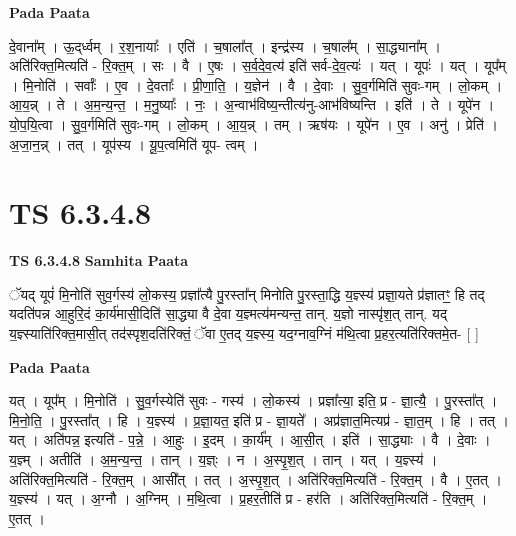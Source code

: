 \documentclass[17pt]{extarticle}
\begin{document}
\textbf{Pada Paata} \newline

दे॒वाना᳚म् । ऊ॒द्‌र्ध्वम् । र॒श॒नायाः᳚ । एति॑ । च॒षाला᳚त् । इन्द्र॑स्य । च॒षाल᳚म् । सा॒द्ध्याना᳚म् । अति॑रिक्त॒मित्यति॑ - रि॒क्त॒म् । सः । वै । ए॒षः । स॒र्व॒दे॒व॒त्य॑ इति॑ सर्व-दे॒व॒त्यः॑ । यत् । यूपः॑ । यत् । यूप᳚म् । मि॒नोति॑ । सर्वाः᳚ । ए॒व । दे॒वताः᳚ । प्री॒णा॒ति॒ । य॒ज्ञेन॑ । वै । दे॒वाः । सु॒व॒र्गमिति॑ सुवः-गम् । लो॒कम् । आ॒य॒न्न् । ते । अ॒म॒न्य॒न्त॒ । म॒नु॒ष्याः᳚ । नः॒ । अ॒न्वाभ॑विष्य॒न्तीत्य॑नु-आभ॑विष्यन्ति । इति॑ । ते । यूपे॑न । यो॒प॒यि॒त्वा । सु॒व॒र्गमिति॑ सुवः-गम् । लो॒कम् । आ॒य॒न्न् । तम् । ऋष॑यः । यूपे॑न । ए॒व । अनु॑ । प्रेति॑ । अ॒जा॒न॒न्न् । तत् । यूप॑स्य । यू॒प॒त्वमिति॑ यूप- त्वम् ।  \newline




\section*{ TS 6.3.4.8 }

\textbf{TS 6.3.4.8 } \newline
\textbf{Samhita Paata} \newline

ॅयद् यूपं॑ मि॒नोति॑ सुव॒र्गस्य॑ लो॒कस्य॒ प्रज्ञा᳚त्यै पु॒रस्ता᳚न् मिनोति पु॒रस्ता॒द्धि य॒ज्ञ्स्य॑ प्रज्ञा॒यते प्र॑ज्ञातꣳ॒॒ हि तद् यदति॑पन्न आ॒हुरि॒दं का॒र्य॑मासी॒दिति॑ सा॒द्ध्या वै दे॒वा य॒ज्ञ्मत्य॑मन्यन्त॒ तान्. य॒ज्ञो नास्पृ॑श॒त् तान्. यद् य॒ज्ञ्स्याति॑रिक्त॒मासी॒त् तद॑स्पृश॒दति॑रिक्तं॒ ॅवा ए॒तद् य॒ज्ञ्स्य॒ यद॒ग्नाव॒ग्निं म॑थि॒त्वा प्र॒हर॒त्यति॑रिक्तमे॒त- [  ] \newline

\textbf{Pada Paata} \newline

यत् । यूप᳚म् । मि॒नोति॑ । सु॒व॒र्गस्येति॑ सुवः - गस्य॑ । लो॒कस्य॑ । प्रज्ञा᳚त्या॒ इति॒ प्र - ज्ञा॒त्यै॒ । पु॒रस्ता᳚त् । मि॒नो॒ति॒ । पु॒रस्ता᳚त् । हि । य॒ज्ञ्स्य॑ । प्र॒ज्ञा॒यत॒ इति॑ प्र - ज्ञा॒यते᳚ । अप्र॑ज्ञात॒मित्यप्र॑ - ज्ञा॒त॒म् । हि । तत् । यत् । अति॑पन्न॒ इत्यति॑ - प॒न्ने॒ । आ॒हुः । इ॒दम् । का॒र्य᳚म् । आ॒सी॒त् । इति॑ । सा॒द्ध्याः । वै । दे॒वाः । य॒ज्ञ्म् । अतीति॑ । अ॒म॒न्य॒न्त॒ । तान् । य॒ज्ञ्ः । न । अ॒स्पृ॒श॒त् । तान् । यत् । य॒ज्ञ्स्य॑ । अति॑रिक्त॒मित्यति॑ - रि॒क्त॒म् । आसी᳚त् । तत् । अ॒स्पृ॒श॒त् । अति॑रिक्त॒मित्यति॑ - रि॒क्त॒म् । वै । ए॒तत् । य॒ज्ञ्स्य॑ । यत् । अ॒ग्नौ । अ॒ग्निम् । म॒थि॒त्वा । प्र॒हर॒तीति॑ प्र - हर॑ति । अति॑रिक्त॒मित्यति॑ - रि॒क्त॒म् । ए॒तत् ।  \newline
\end{document}
